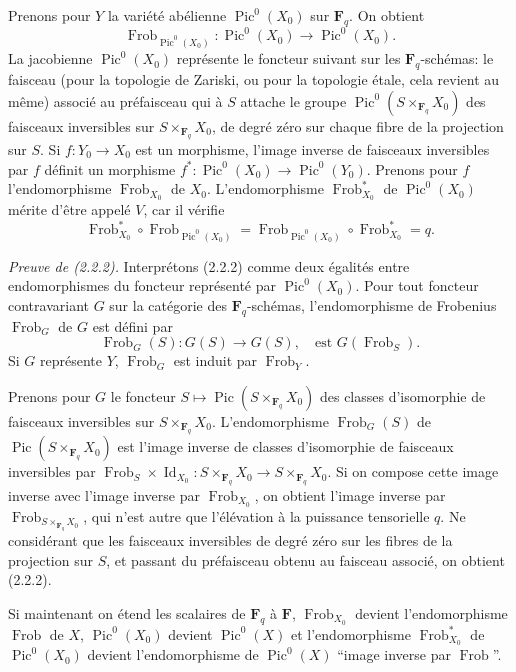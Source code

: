 \documentclass[11pt]{article}
\newcommand{\Fq}{\mathbf{F}_q}
\newcommand{\F}{\mathbf{F}}
\newcommand{\Frob}{\operatorname{Frob}}
\newcommand{\Pic}{\operatorname{Pic}}
\newcommand{\Id}{\operatorname{Id}}
\begin{document}
Prenons pour \(Y\) la variété abélienne \(\Pic^0(X_0)\) sur \(\Fq\). On obtient
\begin{equation}
\Frob_{\Pic^0(X_0)}:\Pic^0(X_0)\longrightarrow \Pic^0(X_0).
\tag{2.2.1}
\end{equation}
La jacobienne \(\Pic^0(X_0)\) représente le foncteur suivant sur les \(\Fq\)-schémas: le faisceau (pour la topologie de Zariski, ou pour la topologie étale, cela revient au même) associé au préfaisceau qui à \(S\) attache le groupe \(\Pic^0(S\times_{\Fq}X_0)\) des faisceaux inversibles sur \(S\times_{\Fq}X_0\), de degré zéro sur chaque fibre de la projection sur \(S\). Si \(f:Y_0\to X_0\) est un morphisme, l'image inverse de faisceaux inversibles par \(f\) définit un morphisme \(f^*:\Pic^0(X_0)\to\Pic^0(Y_0)\). Prenons pour \(f\) l'endomorphisme \(\Frob_{X_0}\) de \(X_0\). L'endomorphisme \(\Frob^*_{X_0}\) de \(\Pic^0(X_0)\) mérite d'être appelé \(V\), car il vérifie
\begin{equation}
\Frob^*_{X_0}\circ \Frob_{\Pic^0(X_0)}=\Frob_{\Pic^0(X_0)}\circ \Frob^*_{X_0}=q.
\tag{2.2.2}
\end{equation}

\noindent\textit{Preuve de (2.2.2).} Interprétons (2.2.2) comme deux égalités entre endomorphismes du foncteur représenté par \(\Pic^0(X_0)\). Pour tout foncteur contravariant \(G\) sur la catégorie des \(\Fq\)-schémas, l'endomorphisme de Frobenius \(\Frob_G\) de \(G\) est défini par
\[
\Frob_G(S):G(S)\to G(S),\quad \text{est }G(\Frob_S).
\]
Si \(G\) représente \(Y\), \(\Frob_G\) est induit par \(\Frob_Y\).

Prenons pour \(G\) le foncteur \(S\mapsto \Pic(S\times_{\Fq}X_0)\) des classes d'isomorphie de faisceaux inversibles sur \(S\times_{\Fq}X_0\). L'endomorphisme \(\Frob_G(S)\) de \(\Pic(S\times_{\Fq}X_0)\) est l'image inverse de classes d'isomorphie de faisceaux inversibles par \(\Frob_S\times\Id_{X_0}:S\times_{\Fq}X_0\to S\times_{\Fq}X_0\). Si on compose cette image inverse avec l'image inverse par \(\Frob_{X_0}\), on obtient l'image inverse par \(\Frob_{S\times_{\Fq}X_0}\), qui n'est autre que l'élévation à la puissance tensorielle \(q\). Ne considérant que les faisceaux inversibles de degré zéro sur les fibres de la projection sur \(S\), et passant du préfaisceau obtenu au faisceau associé, on obtient (2.2.2).

Si maintenant on étend les scalaires de \(\Fq\) à \(\F\), \(\Frob_{X_0}\) devient l'endomorphisme \(\Frob\) de \(X\), \(\Pic^0(X_0)\) devient \(\Pic^0(X)\) et l'endomorphisme \(\Frob^*_{X_0}\) de \(\Pic^0(X_0)\) devient l'endomorphisme de \(\Pic^0(X)\) ``image inverse par \(\Frob\)''.
\end{document}
